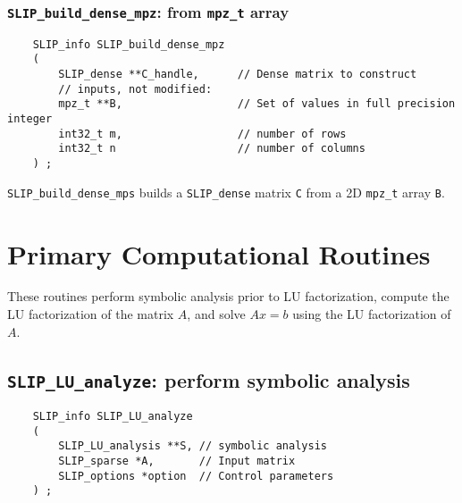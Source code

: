 \documentclass[12pt]{article}
\theoremstyle{definition}
\begin{document}
\cprotect\subsubsection{\verb|SLIP_build_dense_mpz|: from \verb|mpz_t| array}
\label{s:user:build_dense_mpz}

\begin{mdframed}[userdefinedwidth=6in]
{\footnotesize
\begin{verbatim}
    SLIP_info SLIP_build_dense_mpz
    (
        SLIP_dense **C_handle,      // Dense matrix to construct
        // inputs, not modified:
        mpz_t **B,                  // Set of values in full precision integer
        int32_t m,                  // number of rows
        int32_t n                   // number of columns
    ) ;
\end{verbatim}
} \end{mdframed}

\verb|SLIP_build_dense_mps| builds a \verb'SLIP_dense' matrix \verb'C'
from a 2D \verb|mpz_t| array \verb'B'.

\section{Primary Computational Routines}
\label{s:primary}

These routines perform symbolic analysis prior to LU factorization, compute the
LU factorization of the matrix $A$, and solve $Ax=b$ using the LU factorization
of $A$.

\cprotect\subsection{\verb|SLIP_LU_analyze|: perform symbolic analysis}
\label{s:SLIP_LU_analyze}

\begin{mdframed}[userdefinedwidth=6in]
{\footnotesize
\begin{verbatim}
    SLIP_info SLIP_LU_analyze
    (
        SLIP_LU_analysis **S, // symbolic analysis
        SLIP_sparse *A,       // Input matrix
        SLIP_options *option  // Control parameters
    ) ;
\end{verbatim}
} \end{mdframed}
\end{document}
